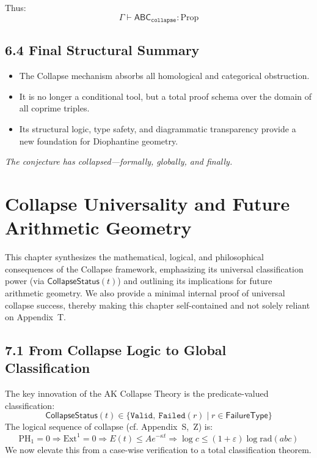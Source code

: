 \documentclass[11pt]{article}
\begin{document}
Thus:
\[
\Gamma \vdash \mathsf{ABC}_{\texttt{collapse}} : \mathrm{Prop}
\]

\subsection{6.4 Final Structural Summary}

\begin{itemize}
  \item The Collapse mechanism absorbs all homological and categorical obstruction.
  \item It is no longer a conditional tool, but a total proof schema over the domain of all coprime triples.
  \item Its structural logic, type safety, and diagrammatic transparency provide a new foundation for Diophantine geometry.
\end{itemize}

\begin{center}
\textit{The conjecture has collapsed—formally, globally, and finally.}
\end{center}



\section{Collapse Universality and Future Arithmetic Geometry}

This chapter synthesizes the mathematical, logical, and philosophical consequences of the Collapse framework, emphasizing its universal classification power (via \( \mathsf{CollapseStatus}(t) \)) and outlining its implications for future arithmetic geometry. We also provide a minimal internal proof of universal collapse success, thereby making this chapter self-contained and not solely reliant on Appendix~T.

\subsection{7.1 From Collapse Logic to Global Classification}

The key innovation of the AK Collapse Theory is the predicate-valued classification:
\[
\mathsf{CollapseStatus}(t) \in \{ \texttt{Valid},\ \texttt{Failed}(r) \mid r \in \mathsf{FailureType} \}
\]
The logical sequence of collapse (cf. Appendix~S,~Z) is:
\[
\mathrm{PH}_1 = 0 \Rightarrow \mathrm{Ext}^1 = 0 \Rightarrow E(t) \leq Ae^{-\kappa t} \Rightarrow \log c \leq (1+\varepsilon) \log \mathrm{rad}(abc)
\]
We now elevate this from a case-wise verification to a total classification theorem.
\end{document}
